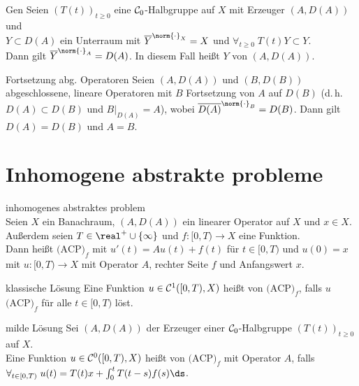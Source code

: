 \begin{Lemma}{Gen}
    Seien $(T(t))_{t \ge 0}$ eine $\mathcal{C}_0$-Halbgruppe auf $X$ mit Erzeuger $(A, D(A))$ und
    \\$Y \subset D(A)$ ein Unterraum mit
    $\overline{Y}^{\norm{\cdot}_X} = X$ und $\forall_{t \ge 0}\; T(t)Y \subset Y$.\\
    Dann gilt $\overline{Y}^{\norm{\cdot}_A} = D(A)$.
    In diesem Fall heißt $Y$  von $(A, D(A))$.
\end{Lemma}

\begin{Lemma}{Fortsetzung abg. Operatoren}
    Seien $(A, D(A))$ und $(B, D(B))$ abgeschlossene, lineare Operatoren
    mit $B$ Fortsetzung von $A$ auf $D(B)$ (d.\,h. $D(A) \subset D(B)$ und $B|_{D(A)} = A$),
    wobei $\overline{D(A)}^{\norm{\cdot}_B} = D(B)$.
    Dann gilt $D(A) = D(B)$ und $A = B$.
\end{Lemma}

\pagebreak

\section{%
    Inhomogene abstrakte probleme%
}

\begin{Def}{inhomogenes abstraktes problem}\\
    Seien $X$ ein Banachraum, $(A, D(A))$ ein linearer Operator auf $X$ und $x \in X$.\\
    Außerdem seien $T \in \real^+ \cup \{\infty\}$ und $f\colon [0, T) \to X$ eine Funktion.\\
    Dann heißt $\text{(ACP)}_f$ mit $u'(t) = Au(t) + f(t)$ für $t \in [0, T)$ und $u(0) = x$
    mit $u\colon [0, T) \to X$ 
    mit Operator $A$, rechter Seite $f$ und Anfangswert $x$.
\end{Def}

\begin{Def}{klassische Lösung}
    Eine Funktion $u \in \mathcal{C}^1([0, T), X)$ heißt  von $\text{(ACP)}_f$,
    falls $u$ $\text{(ACP)}_f$ für alle $t \in [0, T)$ löst.
\end{Def}

\begin{Def}{milde Lösung}
    Sei $(A, D(A))$ der Erzeuger einer $\mathcal{C}_0$-Halbgruppe $(T(t))_{t \ge 0}$ auf $X$.\\
    Eine Funktion $u \in \mathcal{C}^0([0, T), X)$ heißt  von $\text{(ACP)}_f$
    mit Operator $A$, falls\\
    $\forall_{t \in [0, T)}\; u(t) = T(t)x + \int_0^t T(t-s) f(s)\ds$.
\end{Def}

